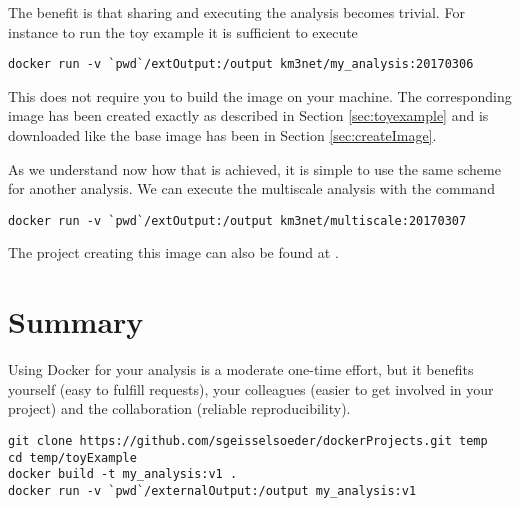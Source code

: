 \documentclass[a4paper, twoside, 11pt]{article}
\begin{document}
The benefit is that sharing and executing the analysis becomes trivial. 
For instance to run the toy example it is sufficient to execute 
\begin{lstlisting}[basicstyle=\ttfamily\small,upquote=true,columns=flexible,keepspaces=true,frame=single]
docker run -v `pwd`/extOutput:/output km3net/my_analysis:20170306
\end{lstlisting}
This does not require you to build the image on your machine. 
The corresponding image has been created exactly as described in Section \ref{sec:toyexample} 
and is downloaded like the base image has been in Section \ref{sec:createImage}. 

As we understand now how that is achieved, 
it is simple to use the same scheme for another analysis. 
We can execute the multiscale analysis 
\cite{geisselsoeder:phd, gith:multiscale} with the command 
\begin{lstlisting}[basicstyle=\ttfamily\small,upquote=true,columns=flexible,keepspaces=true,frame=single]
docker run -v `pwd`/extOutput:/output km3net/multiscale:20170307
\end{lstlisting}
The project creating this image can also be found at \cite{gith:tutorial}.

\section{Summary}

Using Docker for your analysis is a moderate one-time effort, 
but it benefits yourself (easy to fulfill requests), 
your colleagues (easier to get involved in your project) 
and the collaboration (reliable reproducibility).
\bigskip

\begin{lstlisting}[basicstyle=\ttfamily\small,upquote=true,columns=flexible,keepspaces=true,frame=single]
git clone https://github.com/sgeisselsoeder/dockerProjects.git temp
cd temp/toyExample
docker build -t my_analysis:v1 .
docker run -v `pwd`/externalOutput:/output my_analysis:v1
\end{lstlisting}




\end{document}
